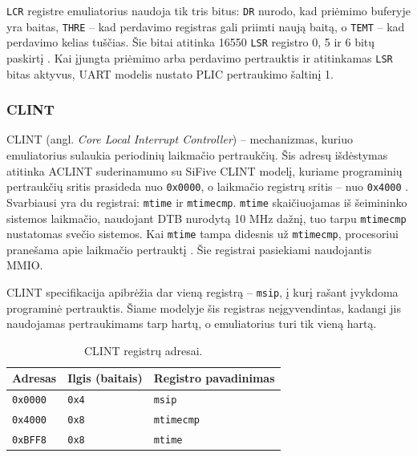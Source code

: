 \texttt{LCR} registre emuliatorius naudoja tik tris bitus: \texttt{DR} nurodo, kad priėmimo buferyje yra baitas, \texttt{THRE} -- kad perdavimo registras gali priimti naują baitą, o \texttt{TEMT} -- kad perdavimo kelias tuščias. Šie bitai atitinka 16550 \texttt{LSR} registro 0, 5 ir 6 bitų paskirtį \cite[p.~20--21]{ti-pc16550d}. Kai įjungta priėmimo arba perdavimo pertrauktis ir atitinkamas \texttt{LSR} bitas aktyvus, UART modelis nustato PLIC pertraukimo šaltinį 1.


\subsubsection{CLINT}

CLINT (angl. \textit{Core Local Interrupt Controller}) -- mechanizmas, kuriuo emuliatorius sulaukia periodinių laikmačio pertraukčių. Šis adresų išdėstymas atitinka ACLINT suderinamumo su SiFive CLINT modelį, kuriame programinių pertraukčių sritis prasideda nuo \texttt{0x0000}, o laikmačio registrų sritis -- nuo \texttt{0x4000} \cite{riscv-aclint-1.0}. Svarbiausi yra du registrai: \texttt{mtime} ir \texttt{mtimecmp}. \texttt{mtime} skaičiuojamas iš šeimininko sistemos laikmačio, naudojant DTB nurodytą 10 MHz dažnį, tuo tarpu \texttt{mtimecmp} nustatomas svečio sistemos. Kai \texttt{mtime} tampa didesnis už \texttt{mtimecmp}, procesoriui pranešama apie laikmačio pertrauktį \cite[p.~61]{riscv-privileged-20260120}. Šie registrai pasiekiami naudojantis MMIO.

CLINT specifikacija apibrėžia dar vieną registrą -- \texttt{msip}, į kurį rašant įvykdoma programinė pertrauktis. Šiame modelyje šis registras neįgyvendintas, kadangi jis naudojamas pertraukimams tarp hartų, o emuliatorius turi tik vieną hartą.

\begin{table}[h]
    \centering
    \begin{tabular}{|l|l|l|}
        \hline
        \textbf{Adresas} & \textbf{Ilgis (baitais)} & \textbf{Registro pavadinimas} \\
        \hline
        \texttt{0x0000} & \texttt{0x4} & \texttt{msip} \\
        \hline
        \texttt{0x4000} & \texttt{0x8} & \texttt{mtimecmp} \\
        \hline
        \texttt{0xBFF8} & \texttt{0x8} & \texttt{mtime} \\
        \hline
    \end{tabular}
    \caption{CLINT registrų adresai.}
    \label{table:clint_registers}
\end{table}

